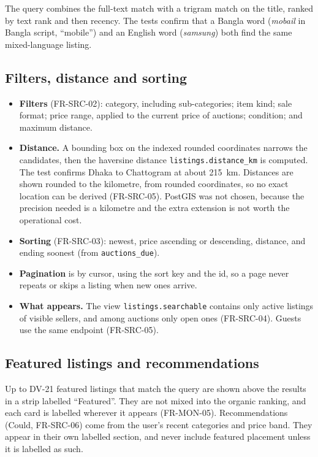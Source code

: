 \documentclass[11pt,a4paper]{article}
\begin{document}
The query combines the full-text match with a trigram match on the title, ranked by text rank and then recency. The tests confirm that a Bangla word (\textit{mobail} in Bangla script, ``mobile'') and an English word (\textit{samsung}) both find the same mixed-language listing.

\subsection{Filters, distance and sorting}
\begin{itemize}[nosep]
  \item \textbf{Filters} (FR-SRC-02): category, including sub-categories; item kind; sale format; price range, applied to the current price of auctions; condition; and maximum distance.
  \item \textbf{Distance.} A bounding box on the indexed rounded coordinates narrows the candidates, then the haversine distance \texttt{listings.distance\_km} is computed. The test confirms Dhaka to Chattogram at about 215~km. Distances are shown rounded to the kilometre, from rounded coordinates, so no exact location can be derived (FR-SRC-05). PostGIS was not chosen, because the precision needed is a kilometre and the extra extension is not worth the operational cost.
  \item \textbf{Sorting} (FR-SRC-03): newest, price ascending or descending, distance, and ending soonest (from \texttt{auctions\_due}).
  \item \textbf{Pagination} is by cursor, using the sort key and the id, so a page never repeats or skips a listing when new ones arrive.
  \item \textbf{What appears.} The view \texttt{listings.searchable} contains only active listings of visible sellers, and among auctions only open ones (FR-SRC-04). Guests use the same endpoint (FR-SRC-05).
\end{itemize}

\subsection{Featured listings and recommendations}
\label{sec:featured}
Up to DV-21 featured listings that match the query are shown above the results in a strip labelled ``Featured''. They are not mixed into the organic ranking, and each card is labelled wherever it appears (FR-MON-05). Recommendations (Could, FR-SRC-06) come from the user's recent categories and price band. They appear in their own labelled section, and never include featured placement unless it is labelled as such.
\end{document}
